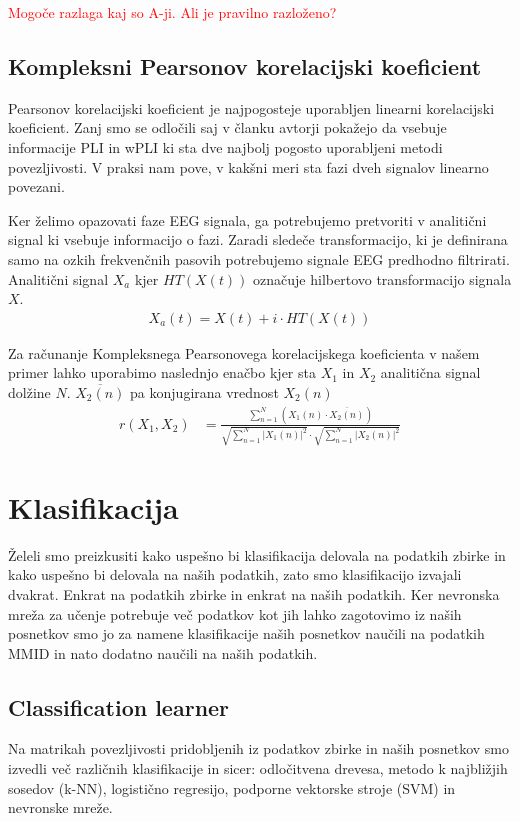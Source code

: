 \textcolor{red}{Mogoče razlaga kaj so A-ji. Ali je pravilno razloženo?}

\cite{sethGrangerCausality2007}

\subsection{Kompleksni Pearsonov korelacijski koeficient}
Pearsonov korelacijski koeficient je najpogosteje uporabljen linearni korelacijski koeficient. Zanj smo se odločili saj v članku  \cite{sverkoComplexPearsonCorrelation2022} 
avtorji pokažejo da vsebuje informacije PLI in wPLI ki sta dve najbolj pogosto uporabljeni metodi povezljivosti. V praksi nam pove, v kakšni meri sta fazi dveh signalov linearno povezani.

Ker želimo opazovati faze EEG signala, ga potrebujemo pretvoriti v analitični signal ki vsebuje informacijo o fazi. Zaradi sledeče transformacijo, ki je definirana samo na ozkih frekvenčnih pasovih potrebujemo signale EEG predhodno filtrirati. Analitični signal $X_a$ kjer $HT(X(t))$ označuje hilbertovo transformacijo signala $X$.
\begin{align*}
    X_a(t) = X(t) + i \cdot HT(X(t))
\end{align*}

Za računanje Kompleksnega Pearsonovega korelacijskega koeficienta v našem primer lahko uporabimo naslednjo enačbo kjer sta $X_1$ in $X_2$ analitična signal dolžine $N$. $\overline{X_2(n)}$ pa konjugirana vrednost $X_2(n)$
\begin{align*}
r(X_1, X_2) &= \frac{\sum\limits_{n=1}^{N}(X_1(n) \cdot \overline{X_2(n)})}{\sqrt{\sum\limits_{n=1}^{N} |X_1(n)|^2} \cdot \sqrt{\sum\limits_{n=1}^{N} |X_2(n)|^2}}
\end{align*}

\section{Klasifikacija}
Želeli smo preizkusiti kako uspešno bi klasifikacija delovala na podatkih zbirke in kako uspešno bi delovala na naših podatkih, zato smo klasifikacijo izvajali dvakrat. Enkrat na podatkih zbirke in enkrat na naših podatkih. Ker nevronska mreža za učenje potrebuje več podatkov kot jih lahko zagotovimo iz naših posnetkov smo jo za namene klasifikacije naših posnetkov naučili na podatkih MMID in nato dodatno naučili na naših podatkih. 

\subsection{Classification learner}
Na matrikah povezljivosti pridobljenih iz podatkov zbirke in naših posnetkov smo izvedli več različnih klasifikacije in sicer: odločitvena drevesa, metodo k najbližjih sosedov (k-NN), logistično regresijo, podporne vektorske stroje (SVM) in nevronske mreže.


